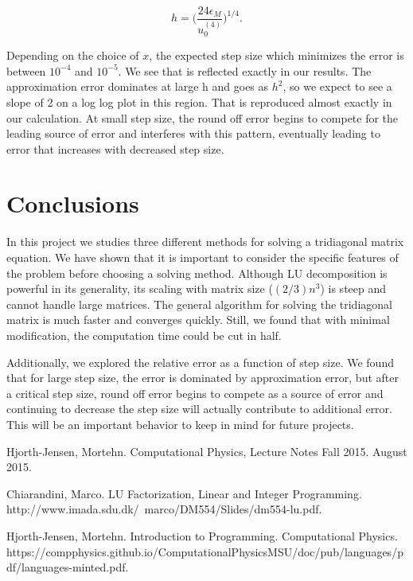 \documentclass[%
oneside,                 %
final,                   %
10pt]{article}
\begin{document}
\begin{equation*}
h= \Bigg( \frac{24 \epsilon_M}{u_0^{(4)}} \Bigg)^{1/4}.
\end{equation*}

Depending on the choice of $x$, the expected step size which minimizes the error is between $10^{-4}$ and $10^{-5}$.  We see that is reflected exactly in our results.  The approximation error dominates at large h and goes as $h^2$, so we expect to see a slope of 2 on a log log plot in this region.  That is reproduced almost exactly in our calculation.  At small step size, the round off error begins to compete for the leading source of error and interferes with this pattern, eventually leading to error that increases with decreased step size.

\section{Conclusions}

In this project we studies three different methods for solving a tridiagonal matrix equation.  We have shown that it is important to consider the specific features of the problem before choosing a solving method.  Although LU decomposition is powerful in its generality, its scaling with matrix size ($(2/3)n^3$) is steep and cannot handle large matrices.  The general algorithm for solving the tridiagonal matrix is much faster and converges quickly.  Still, we found that with minimal modification, the computation time could be cut in half. 

Additionally, we explored the relative error as a function of step size.  We found that for large step size, the error is dominated by approximation error, but after a critical step size, round off error begins to compete as a source of error and continuing to decrease the step size will actually contribute to additional error.  This will be an important behavior to keep in mind for future projects.

\begin{thebibliography}{9}

Hjorth-Jensen, Mortehn. 
Computational Physics, Lecture Notes Fall 2015. 
August 2015.

Chiarandini, Marco. 
LU Factorization, Linear and Integer Programming. 
http://www.imada.sdu.dk/~marco/DM554/Slides/dm554-lu.pdf.

Hjorth-Jensen, Mortehn. 
Introduction to Programming. 
Computational Physics.
https://compphysics.github.io/ComputationalPhysicsMSU/doc/pub/languages/pdf/languages-minted.pdf.

\end{thebibliography}




\end{document}
